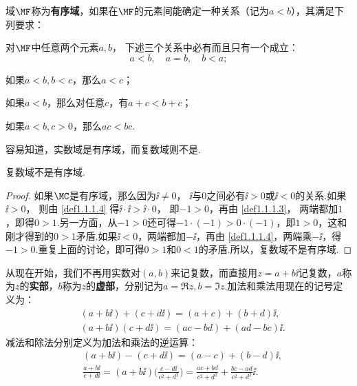\begin{definition}\label{def1.1.1}
域$\MF$称为\textbf{有序域}，如果在$\MF$的元素间能确定一种关系（记为$a<b$），其满足下列要求：
\begin{eenum}
  \item \label{def1.1.1.1}对$\MF$中任意两个元素$a,b$， 下述三个关系中必有而且只有一个成立：
  \[a<b,\quad a=b,\quad b<a;\]
  \item \label{def1.1.1.2}如果$a<b,b<c$，那么$a<c$；
  \item \label{def1.1.1.3}如果$a<b$，那么对任意$c$，有$a+c<b+c$；
  \item \label{def1.1.1.4}如果$a<b,c>0$，那么$ac<bc$.
\end{eenum}
\end{definition}
容易知道，实数域是有序域，而复数域则不是.
\begin{theorem}\label{thm1.1.2}
复数域不是有序域.
\end{theorem}
\begin{proof}
如果$\MC$是有序域，那么因为$\ii\ne0$， $\ii$与$0$之间必有$\ii>0$或$\ii<0$的关系.如果$\ii>0$， 则由 \ref{def1.1.1.4} 得$\ii\cdot\ii>\ii\cdot0$， 即$-1>0$，再由 \ref{def1.1.1.3}， 两端都加$1$，即得$0>1$.另一方面，从$-1>0$还可得$-1\cdot(-1)>0\cdot(-1)$，即$1>0$，这和刚才得到的$0>1$矛盾.如果$\ii<0$，两端都加$-\ii$，再由 \ref{def1.1.1.4}，两端乘$-\ii$，得$-1>0$.重复上面的讨论，即可得$0>1$和$0<1$的矛盾.所以，复数域不是有序域.
\end{proof}

从现在开始，我们不再用实数对$(a,b)$来记复数，而直接用$z=a+b\ii$记复数，$a$称为$z$的\textbf{实部}，$b$称为$z$的\textbf{虚部}，分别记为$a=\Re z,b=\Im z$.加法和乘法用现在的记号定义为：
\begin{align*}
&(a+b\ii)+(c+d\ii)=(a+c)+(b+d)\ii,\\
&(a+b\ii)(c+d\ii)=(ac-bd)+(ad-bc)\ii.
\end{align*}
减法和除法分别定义为加法和乘法的逆运算：
\begin{align*}
&(a+b\ii)-(c+d\ii)=(a-c)+(b-d)\ii,\\
&\frac{a+b\ii}{c+d\ii}=(a+b\ii)\bigg(\frac{c-d\ii}{c^2+d^2}\bigg)
=\frac{ac+bd}{c^2+d^2}+\frac{bc-ad}{c^2+d^2}\ii.
\end{align*}

